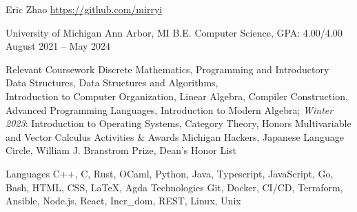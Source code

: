 \documentclass[letterpaper,11pt]{article}
\begin{document}
\rheading
  {Eric Zhao}
  {}
  {\href{https://github.com/mirryi}{https://github.com/mirryi}}
  {}

  \begin{rsectionlist}
    \rsectionitem%
      {University of Michigan}
      {Ann Arbor, MI}
      {B.E. Computer Science, GPA: 4.00/4.00}
      {August 2021 -- May 2024}
      \begin{rpointlist}
        \rpoint
          {Relevant Coursework}
          {Discrete Mathematics, Programming and Introductory Data Structures, Data Structures and
            Algorithms, \\ Introduction to Computer Organization, Linear Algebra, Compiler
            Construction, Advanced Programming Languages, Introduction to Modern Algebra;
            \emph{Winter 2023}: Introduction to Operating Systems, Category Theory, Honors
            Multivariable and Vector Calculus}
        \rpoint
          {Activities \& Awards}
          {Michigan Hackers, Japanese Language Circle, William J. Branstrom Prize, Dean's Honor List}
      \end{rpointlist}
  \end{rsectionlist}

  \begin{rlinelist}
    \rline
      {Languages}
      {C++, C, Rust, OCaml, Python, Java, Typescript, JavaScript, Go, Bash, HTML, CSS, \LaTeX, Agda}
    \rline
      {Technologies}
      {Git, Docker, CI/CD, Terraform, Ansible, Node.js, React, Incr\_dom, REST, Linux, Unix}
  \end{rlinelist}
\end{document}
